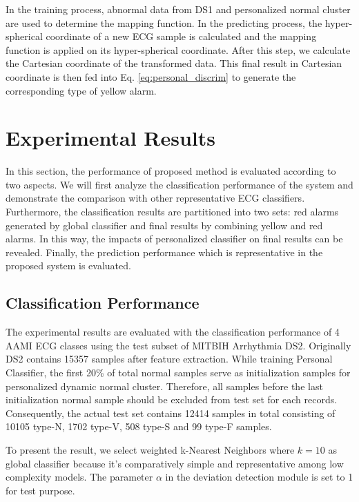 In the training process, abnormal data from DS1 and personalized normal cluster are used to determine the mapping function. In the predicting process, the hyper-spherical coordinate of a new ECG sample is calculated and the mapping function is applied on its hyper-spherical coordinate. After this step, we calculate the Cartesian coordinate of the transformed data. This final result in Cartesian coordinate is then fed into Eq. \ref{eq:personal_discrim} to generate the corresponding type of yellow alarm.

\section{Experimental Results}\label{sec:result_spatial}

In this section, the performance of proposed method is evaluated according to two aspects. We will first analyze the classification performance of the system and demonstrate the comparison with other representative ECG classifiers. Furthermore, the classification results are partitioned into two sets:  red alarms generated by global classifier and final results by combining yellow and red alarms. In this way, the impacts of personalized classifier on final results can be revealed. Finally, the prediction performance which is representative in the proposed system is evaluated.

\subsection{Classification Performance}

The experimental results are evaluated with the classification performance of 4 AAMI ECG classes using the test subset of MITBIH Arrhythmia DS2. Originally DS2 contains 15357 samples after feature extraction. While training Personal Classifier, the first 20\% of total normal samples serve as initialization samples for personalized dynamic normal cluster. Therefore, all samples before the last initialization normal sample should be excluded from test set for each records. Consequently, the actual test set contains 12414 samples in total consisting of 10105 type-N, 1702 type-V, 508 type-S and 99 type-F samples.

To present the result, we select weighted k-Nearest Neighbors where $k=10$ as global classifier because it's comparatively simple and representative among low complexity models. The parameter $\alpha$ in the deviation detection module is set to 1 for test purpose. 


